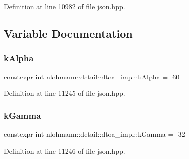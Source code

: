 Definition at line 10982 of file json.\+hpp.



\subsection{Variable Documentation}
\mbox{\label{namespacenlohmann_1_1detail_1_1dtoa__impl_ac1ea1316de0b4a219f707c76b1db1966}} 
\subsubsection{\texorpdfstring{kAlpha}{kAlpha}}
{\footnotesize\ttfamily constexpr int nlohmann\+::detail\+::dtoa\+\_\+impl\+::k\+Alpha = -\/60}



Definition at line 11245 of file json.\+hpp.

\mbox{\label{namespacenlohmann_1_1detail_1_1dtoa__impl_a4a750fcc38da1ce68b7e25ab3a230e20}} 
\subsubsection{\texorpdfstring{kGamma}{kGamma}}
{\footnotesize\ttfamily constexpr int nlohmann\+::detail\+::dtoa\+\_\+impl\+::k\+Gamma = -\/32}



Definition at line 11246 of file json.\+hpp.

